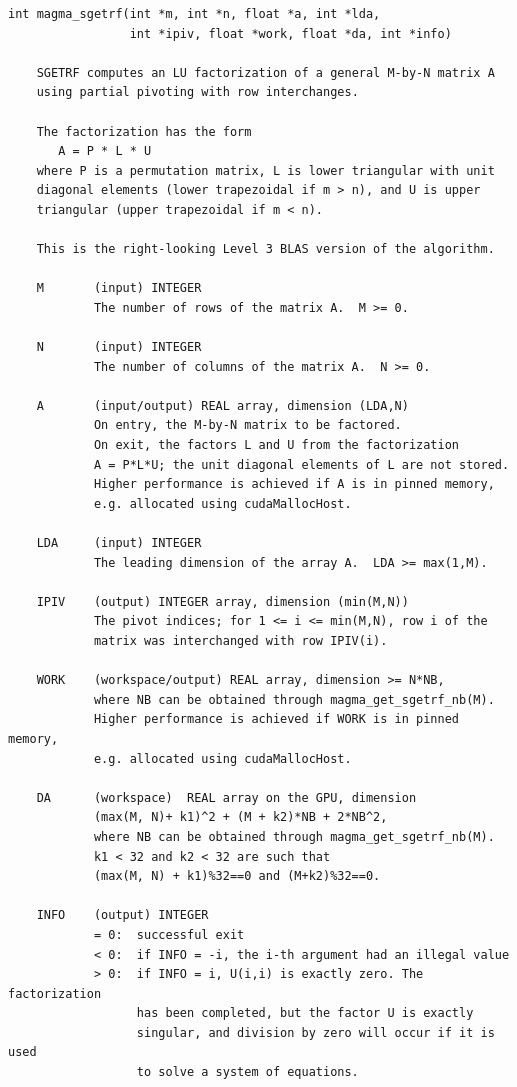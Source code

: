 \documentclass[10pt]{book}
\begin{document}
\begin{verbatim}
int magma_sgetrf(int *m, int *n, float *a, int *lda, 
                 int *ipiv, float *work, float *da, int *info)
                    
    SGETRF computes an LU factorization of a general M-by-N matrix A   
    using partial pivoting with row interchanges.   

    The factorization has the form   
       A = P * L * U   
    where P is a permutation matrix, L is lower triangular with unit   
    diagonal elements (lower trapezoidal if m > n), and U is upper   
    triangular (upper trapezoidal if m < n).   

    This is the right-looking Level 3 BLAS version of the algorithm.   

    M       (input) INTEGER   
            The number of rows of the matrix A.  M >= 0.   

    N       (input) INTEGER   
            The number of columns of the matrix A.  N >= 0.   

    A       (input/output) REAL array, dimension (LDA,N)   
            On entry, the M-by-N matrix to be factored.   
            On exit, the factors L and U from the factorization   
            A = P*L*U; the unit diagonal elements of L are not stored.   
            Higher performance is achieved if A is in pinned memory, 
            e.g. allocated using cudaMallocHost.

    LDA     (input) INTEGER   
            The leading dimension of the array A.  LDA >= max(1,M).   

    IPIV    (output) INTEGER array, dimension (min(M,N))   
            The pivot indices; for 1 <= i <= min(M,N), row i of the   
            matrix was interchanged with row IPIV(i).   

    WORK    (workspace/output) REAL array, dimension >= N*NB,
            where NB can be obtained through magma_get_sgetrf_nb(M).
            Higher performance is achieved if WORK is in pinned memory, 
            e.g. allocated using cudaMallocHost.

    DA      (workspace)  REAL array on the GPU, dimension 
            (max(M, N)+ k1)^2 + (M + k2)*NB + 2*NB^2,
            where NB can be obtained through magma_get_sgetrf_nb(M).
            k1 < 32 and k2 < 32 are such that 
            (max(M, N) + k1)%32==0 and (M+k2)%32==0.

    INFO    (output) INTEGER   
            = 0:  successful exit   
            < 0:  if INFO = -i, the i-th argument had an illegal value   
            > 0:  if INFO = i, U(i,i) is exactly zero. The factorization   
                  has been completed, but the factor U is exactly   
                  singular, and division by zero will occur if it is used   
                  to solve a system of equations.   
\end{verbatim}
\end{document}

